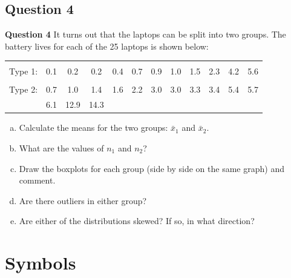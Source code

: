 \documentclass[compress]{beamer}        %
\makeatletter
\newcommand{\tcb}{\textcolor{beamer@blendedblue}}
\makeatother
\begin{document}
\subsection{Question 4}
\begin{frame}{\bf \tcb{Question 4}}
It turns out that the laptops can be split into two groups. The battery lives for each of the 25 laptops is shown below:\vspace{-0.2cm}
\begin{adjustwidth}{-0.3cm}{}
\begin{tabular}{|cccccccccccc|}
\hline
&&&&&&&&&&&\\[-0.4cm]
Type 1: & 0.1 & 0.2 & 0.2 & 0.4 & 0.7 & 0.9 & 1.0 & 1.5 & 2.3 & 4.2 & 5.6 \\[0.1cm]
\hline
&&&&&&&&&&&\\[-0.4cm]
Type 2: & 0.7 & 1.0 & 1.4 & 1.6 & 2.2 & 3.0 & 3.0 & 3.3 & 3.4 & 5.4 & 5.7 \\
& 6.1 & 12.9 & 14.3 &&&&&&&&\\
\hline
\end{tabular}
\end{adjustwidth}
\begin{enumerate}[a)]\itemsep0.3cm
\item Calculate the means for the two groups: $\bar x_1$ and $\bar x_2$.
\item What are the values of $n_1$ and $n_2$?
\item Draw the boxplots for each group (side by side on the same graph) and comment.
\item Are there outliers in either group?
\item Are either of the distributions skewed? If so, in what direction?
\end{enumerate}
\end{frame}



\section{Symbols}
\end{document}
